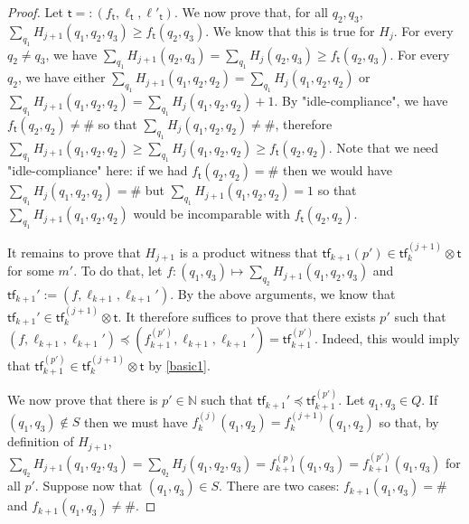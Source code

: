 \documentclass[10pt,a4paper]{article}
\let\mathbb\mathds
\renewcommand{\geq}{\geqslant}
\newcommand{\nats}{\mathbb{N}}
\newcommand{\deff}{:=}
\newcommand*{\states}{Q}
\newcommand*{\abuchistate}{\ell}
\newcommand*{\controlloc}{\abuchistate}
\newcommand*{\dummysymb}{\#}
\newcommand*{\atf}{\mathsf{tf}}
\newcommand*{\tftimes}{\otimes}
\newcommand*{\letf}{\preceq}
\newcommand*{\tftrans}{\mathsf{t}}
\begin{document}
\begin{appendixproof}
\begin{proof}
		Let \(\tftrans =: (f_{\tftrans}, \controlloc_{\tftrans}, \controlloc'_\tftrans)\).
		We now prove that, for all \(q_2,q_3\), \(\sum_{q_1} H_{j+1}(q_1,q_2,q_3) \geq f_{\tftrans}(q_2,q_3)\).
		We know that this is true for \(H_j\).
		For every \(q_2 \ne q_3\), we have \(\sum_{q_1} H_{j+1}(q_2,q_3) = \sum_{q_1} H_j(q_2,q_3) \geq f_{\tftrans}(q_2,q_3)\).
		For every \(q_2\), we have either \(\sum_{q_1} H_{j+1}(q_1,q_2,q_2) = \sum_{q_1} H_{j}(q_1,q_2,q_2)\) or \(\sum_{q_1} H_{j+1}(q_1,q_2,q_2) = \sum_{q_1} H_{j}(q_1,q_2,q_2)+1\).
		By "idle-compliance", we have \(f_{\tftrans}(q_2,q_2) \ne \dummysymb\) so that \(\sum_{q_1} H_{j}(q_1,q_2,q_2) \ne \dummysymb\), therefore \(\sum_{q_1} H_{j+1}(q_1,q_2,q_2) \geq \sum_{q_1} H_{j}(q_1,q_2,q_2) \geq f_{\tftrans}(q_2,q_2)\).
		Note that we need "idle-compliance" here: if we had \(f_{\tftrans}(q_2,q_2) = \dummysymb\) then we would have \(\sum_{q_1} H_{j}(q_1,q_2,q_2) = \dummysymb\) but \(\sum_{q_1} H_{j+1}(q_1,q_2,q_2)= 1\) so that \(\sum_{q_1} H_{j+1}(q_1,q_2,q_2)\) would be incomparable with \(f_{\tftrans}(q_2,q_2)\).

		It remains to prove that \(H_{j+1}\) is a product witness that \(\atf_{k+1}{(p')} \in \atf_k^{(j+1)} \tftimes \tftrans\) for some \(m'\).
		To do that, let \(f : (q_1,q_3) \mapsto \sum_{q_2} H_{j+1}(q_1,q_2,q_3)\) and \(\atf_{k+1}' \deff (f, \controlloc_{k+1}, \controlloc_{k+1}')\).
		By the above arguments, we know that \(\atf_{k+1}' \in \atf_{k}^{(j+1)} \tftimes \tftrans\).
		It therefore suffices to prove that there exists \(p'\) such that \((f, \controlloc_{k+1}, \controlloc_{k+1}') \letf (f_{k+1}^{(p')}, \controlloc_{k+1}, \controlloc_{k+1}') = \atf_{k+1}^{(p')}\).
		Indeed, this would imply that \(\atf_{k+1}^{(p')} \in \atf_k^{(j+1)} \tftimes \tftrans\) by \ref{basic1}.

		We now prove that there is \(p' \in \nats\) such that \(\atf_{k+1}' \letf \atf_{k+1}^{(p')}\).
		Let \(q_1,q_3 \in \states\).
		If \((q_1,q_3) \notin S\) then we must have \(f_k^{(j)}(q_1,q_2) = f_k^{(j+1)}(q_1,q_2)\) so that, by definition of \(H_{j+1}\), \(\sum_{q_2} H_{j+1}(q_1,q_2,q_3) = \sum_{q_2} H_j(q_1,q_2,q_3) = f_{k+1}^{(p)}(q_1,q_3) = f_{k+1}^{(p')}(q_1,q_3)\) for all \(p'\).
		Suppose now that \((q_1,q_3) \in S\).
		There are two cases: \(f_{k+1}(q_1,q_3)= \dummysymb\) and \(f_{k+1}(q_1,q_3) \ne \dummysymb\).


\end{proof}
\end{appendixproof}
\end{document}
